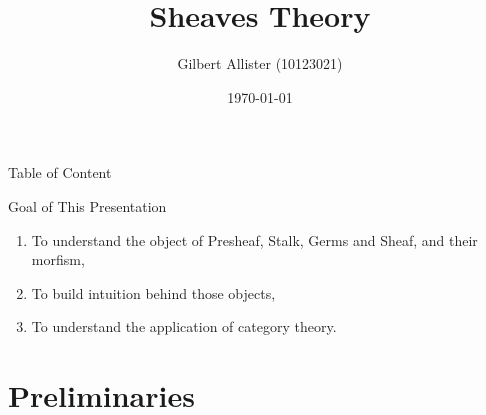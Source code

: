 \documentclass[10pt,aspectratio=1610]{beamer}
\title{Sheaves Theory}
\author{Gilbert Allister (10123021)}
\date{\today}
\theoremstyle{definition}
\begin{document}
    \frame{\titlepage}

    \begin{frame}{Table of Content}
        \tableofcontents
    \end{frame}

    \begin{frame}{Goal of This Presentation}
        \begin{enumerate}
            \item To understand the object of Presheaf, Stalk, Germs and Sheaf, and their morfism,
            \item To build intuition behind those objects,
            \item To understand the application of category theory.
        \end{enumerate}
        
    \end{frame}

    \section{Preliminaries}
\end{document}
